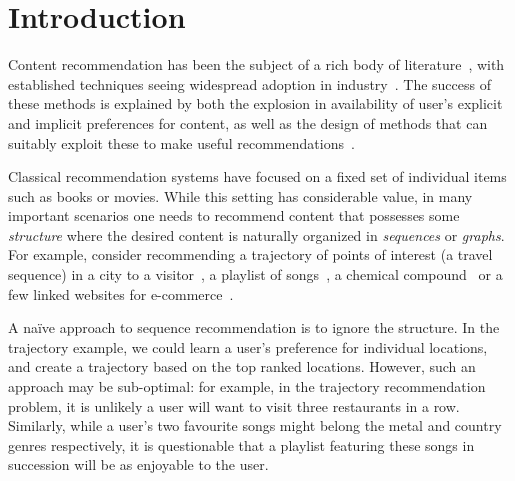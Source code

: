 
\section{Introduction}
\label{sec:intro}

Content recommendation has been the subject of a rich body of literature~\citep{Goldberg:1992,Sarwar:2001,Koren:2010},
with established techniques seeing widespread adoption in industry~\citep{Linden:2003,Agarwal:2013,Amatriain:2015,Gomez-Uribe:2015}.
The success of these methods is explained by both the explosion in availability of user's explicit and implicit preferences for content,
as well as the design of methods that can suitably exploit these to make useful recommendations~\citep{Koren:2009}.

Classical recommendation systems have focused on a fixed set of individual items such as books or movies. %
While this setting has considerable value,
in many important scenarios one needs to recommend content that possesses some \emph{structure}%
where the desired content is naturally organized in
\emph{sequences} or {\em graphs}.
For example, consider %
recommending a trajectory of points of interest (\ie a travel sequence) in a city to a visitor~\citep{lu2010photo2trip,lu2012personalized,ijcai15,cikm16paper}, 
a playlist of songs~\citep{McFee:2011,chen2012playlist,hidasi2015session,choi2016towards},
a chemical compound~\cite{dehaspe1998finding} or a few linked websites for e-commerce~\cite{antikacioglu2015recommendation}.
%

A na\"{i}ve approach to sequence recommendation is to ignore the structure.
In the trajectory example, we could learn a user's preference for individual locations,
and create a trajectory based on the top ranked locations.
However, such an approach may be sub-optimal:
for example,
in the trajectory recommendation problem, it is unlikely a user will want to visit three restaurants in a row.
Similarly,
while a user's two favourite songs might belong
the metal and country genres respectively,
it is questionable that a playlist featuring these songs in succession will be as enjoyable to the user.

